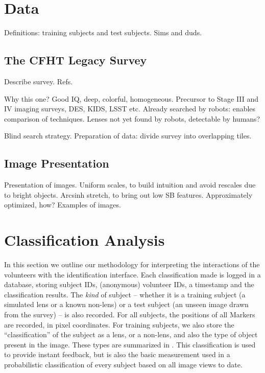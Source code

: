 \documentclass[useAMS,usenatbib,a4paper]{mn2e}
\begin{document}

\section{Data}
\label{sec:data}

Definitions: training subjects and test subjects. Sims and duds.


\subsection{The CFHT Legacy Survey}
\label{sec:data:CFHTLS}

Describe survey. Refs. 

Why this one? Good IQ, deep, colorful, homogeneous. Precursor to Stage III and
IV imaging surveys, DES, KIDS, LSST etc. Already searched by robots: enables
comparison of techniques. Lenses not yet found by robots, detectable by
humans? 

Blind search strategy.
Preparation of data: divide survey into overlapping tiles. 



\subsection{Image Presentation}
\label{sec:data:display}

Presentation of images. Uniform scales, to build intuition and avoid rescales
due to bright objects. Arcsinh stretch, to bring out low SB features. 
Approximately optimized, how? Examples of images.



\section{Classification Analysis}
\label{sec:swap}

In this section we outline our methodology for interpreting the interactions
of the volunteers with the identification interface.  Each classification made
is logged in a database, storing subject IDs, (anonymous) volunteer IDs, a
timestamp and the classification results.  The {\it kind} of subject --
whether it is a training subject (a  simulated lens or a known non-lens) or a
test subject (an unseen image drawn from the survey) -- is also recorded. For
all subjects, the positions of all Markers are recorded, in pixel coordinates.
For training subjects, we also store the ``classification'' of the subject as
a lens, or a non-lens, and also the type of object present in the image. These
types are summarized in .  This classification is used
to provide instant feedback, but is also the basic measurement used in a
probabilistic classification of every subject based on all image views to
date.
\end{document}
